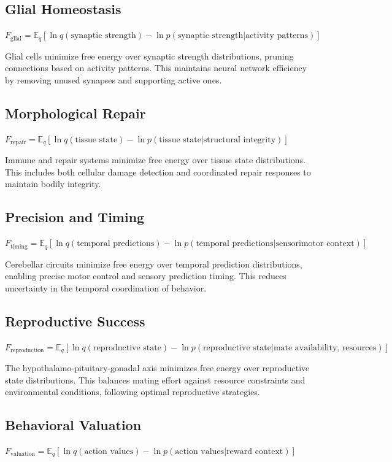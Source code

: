 \documentclass[11pt]{article}
\begin{document}
\subsection{Glial Homeostasis}
$F_{\text{glial}} = \mathbb{E}_q[\ln q(\text{synaptic strength}) - \ln p(\text{synaptic strength}|\text{activity patterns})]$

Glial cells minimize free energy over synaptic strength distributions, pruning connections based on activity patterns. This maintains neural network efficiency by removing unused synapses and supporting active ones.

\subsection{Morphological Repair}
$F_{\text{repair}} = \mathbb{E}_q[\ln q(\text{tissue state}) - \ln p(\text{tissue state}|\text{structural integrity})]$

Immune and repair systems minimize free energy over tissue state distributions. This includes both cellular damage detection and coordinated repair responses to maintain bodily integrity.

\subsection{Precision and Timing}
$F_{\text{timing}} = \mathbb{E}_q[\ln q(\text{temporal predictions}) - \ln p(\text{temporal predictions}|\text{sensorimotor context})]$

Cerebellar circuits minimize free energy over temporal prediction distributions, enabling precise motor control and sensory prediction timing. This reduces uncertainty in the temporal coordination of behavior.

\subsection{Reproductive Success}
$F_{\text{reproduction}} = \mathbb{E}_q[\ln q(\text{reproductive state}) - \ln p(\text{reproductive state}|\text{mate availability, resources})]$

The hypothalamo-pituitary-gonadal axis minimizes free energy over reproductive state distributions. This balances mating effort against resource constraints and environmental conditions, following optimal reproductive strategies.

\subsection{Behavioral Valuation}
$F_{\text{valuation}} = \mathbb{E}_q[\ln q(\text{action values}) - \ln p(\text{action values}|\text{reward context})]$
\end{document}
